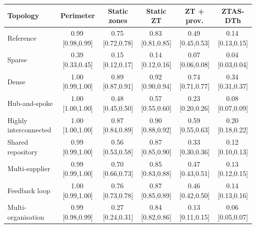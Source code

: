 \begin{tabular}{@{}lccccc@{}}
\toprule
Topology & Perimeter & Static zones & Static ZT & ZT + prov. & ZTAS-DTh \\
\midrule
Reference & 0.99\,[0.98,0.99] & 0.75\,[0.72,0.78] & 0.83\,[0.81,0.85] & 0.49\,[0.45,0.53] & 0.14\,[0.13,0.15] \\
Sparse & 0.39\,[0.33,0.45] & 0.15\,[0.12,0.17] & 0.14\,[0.12,0.16] & 0.07\,[0.06,0.08] & 0.04\,[0.03,0.04] \\
Dense & 1.00\,[0.99,1.00] & 0.89\,[0.87,0.91] & 0.92\,[0.90,0.94] & 0.74\,[0.71,0.77] & 0.34\,[0.31,0.37] \\
Hub-and-spoke & 1.00\,[1.00,1.00] & 0.48\,[0.45,0.50] & 0.57\,[0.55,0.60] & 0.23\,[0.20,0.26] & 0.08\,[0.07,0.09] \\
Highly interconnected & 1.00\,[1.00,1.00] & 0.87\,[0.84,0.89] & 0.90\,[0.88,0.92] & 0.59\,[0.55,0.63] & 0.20\,[0.18,0.22] \\
Shared repository & 0.99\,[0.99,1.00] & 0.56\,[0.53,0.58] & 0.87\,[0.85,0.90] & 0.33\,[0.30,0.36] & 0.12\,[0.10,0.13] \\
Multi-supplier & 0.99\,[0.99,1.00] & 0.70\,[0.66,0.73] & 0.85\,[0.83,0.88] & 0.47\,[0.43,0.51] & 0.13\,[0.12,0.15] \\
Feedback loop & 1.00\,[0.99,1.00] & 0.76\,[0.73,0.78] & 0.87\,[0.85,0.89] & 0.46\,[0.42,0.50] & 0.14\,[0.13,0.16] \\
Multi-organisation & 0.99\,[0.98,0.99] & 0.27\,[0.24,0.31] & 0.84\,[0.82,0.86] & 0.13\,[0.11,0.15] & 0.06\,[0.05,0.07] \\
\bottomrule
\end{tabular}
